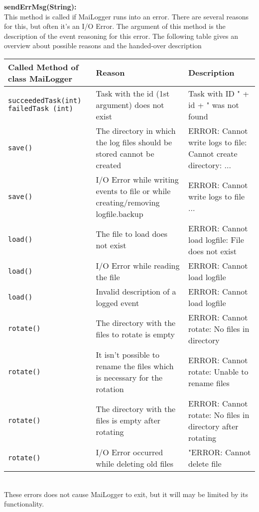 \documentclass{article}
\begin{document}
    \textbf{sendErrMsg(String):} \\
    This method is called if MaiLogger runs into an error.
    There are several reasons for this, but often it's an I/O Error.
    The argument of this method is the description of the event reasoning for this error.
    The following table gives an overview about possible reasons and the handed-over description \\

    \begin{tabular}{p{3cm}|p{5cm}|p{6cm}}
        Called Method of class MaiLogger & Reason & Description \\
        \hline
        \lstinline|succeededTask(int)| \lstinline|failedTask (int)| & Task with the id (1st argument) does not exist & Task with ID " + id + " was not found \\
        \lstinline|save()| & The directory in which the log files should be stored cannot be created & ERROR: Cannot write logs to file: Cannot create directory: ...\\
        \lstinline|save()| & I/O Error while writing events to file or while creating/removing logfile.backup & ERROR: Cannot write logs to file ... \\
        \lstinline|load()| & The file to load does not exist & ERROR: Cannot load logfile: File does not exist \\
        \lstinline|load()| & I/O Error while reading the file & ERROR: Cannot load logfile \\
        \lstinline|load()| & Invalid description of a logged event & ERROR: Cannot load logfile \\
        \lstinline|rotate()| & The directory with the files to rotate is empty & ERROR: Cannot rotate: No files in directory \\
        \lstinline|rotate()| & It isn't possible to rename the files which is necessary for the rotation & ERROR: Cannot rotate: Unable to rename files \\
        \lstinline|rotate()| & The directory with the files is empty after rotating & ERROR: Cannot rotate: No files in directory after rotating \\
        \lstinline|rotate()| & I/O Error occurred while deleting old files & "ERROR: Cannot delete file \\
    \end{tabular} \\

    These errors does not cause MaiLogger to exit, but it will may be limited by its functionality.
\end{document}
